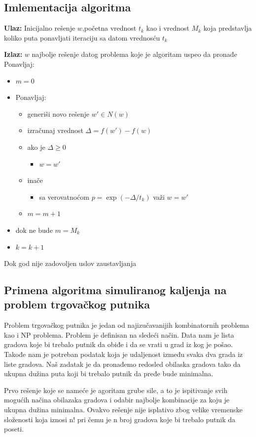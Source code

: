 \documentclass[a4paper]{article}
\begin{document}
\subsection{Imlementacija algoritma}
\textbf{Ulaz:} Inicijalno rešenje $w$,početna vrednost $t_k$ kao i vrednost $M_k$ koja predstavlja koliko puta ponavljati iteraciju sa datom vrednosću $t_k$
 \par
\textbf{Izlaz:} $w$ najbolje rešenje datog problema koje je algoritam uspeo da pronađe
\newline
Ponavljaj:
\begin{itemize}
\item[] $m=0$
\item[]  Ponavljaj:
\begin{itemize}
\item[] generiši novo rešenje  $w'\in N(w)$
\item[] izračunaj vrednost  $\Delta=f(w')-f(w)$
\item[] ako je $\Delta \geq 0$
\begin{itemize}
\item[] $w=w'$ 
\end{itemize}
\item[]inače
\begin{itemize}
\item[] sa verovatnoćom $p=\exp(-\Delta/t_k)$ važi $w=w'$ 
\end{itemize}
\item[]$m=m+1$
\end{itemize}
\item[]dok ne bude $ m=M_k$
\item[] $k=k+1$
\end{itemize}
Dok god nije zadovoljen uslov zaustavljanja


\subsection{Primena algoritma simuliranog kaljenja\cite{sannealing_tsp_application} na problem trgovačkog putnika}


  Problem trgovačkog putnika je jedan od najizučavanijih kombinatornih problema kao i NP problema. Problem je definisan na sledeći način.
  Data nam je lista gradova koje bi trebalo putnik da obiđe i da se vrati u grad iz kog je pošao. Takođe nam je potreban podatak koja je udaljenost između svaka dva grada iz liste gradova. Naš zadatak je da pronađemo redosled obilaska gradova tako da ukupna dužina puta koji bi trebalo putnik da pređe bude minimalna.\par
  Prvo rešenje koje se nameće je agoritam grube sile, a to je ispitivanje svih mogućih načina obilazaka gradova i odabir najbolje kombinacije za koju je ukupna dužina minimalna. Ovakvo rešenje nije isplativo zbog velike vremenske složenosti koja iznosi n! pri čemu je n broj gradova koje bi trebalo putnik da poseti.\par
    
\end{document}
